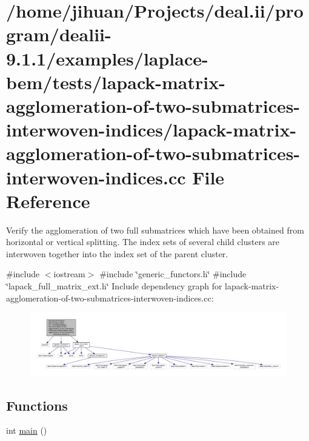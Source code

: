 \hypertarget{lapack-matrix-agglomeration-of-two-submatrices-interwoven-indices_8cc}{}\section{/home/jihuan/\+Projects/deal.ii/program/dealii-\/9.1.1/examples/laplace-\/bem/tests/lapack-\/matrix-\/agglomeration-\/of-\/two-\/submatrices-\/interwoven-\/indices/lapack-\/matrix-\/agglomeration-\/of-\/two-\/submatrices-\/interwoven-\/indices.cc File Reference}
\label{lapack-matrix-agglomeration-of-two-submatrices-interwoven-indices_8cc}


Verify the agglomeration of two full submatrices which have been obtained from horizontal or vertical splitting. The index sets of several child clusters are interwoven together into the index set of the parent cluster.  


{\ttfamily \#include $<$iostream$>$}\newline
{\ttfamily \#include \char`\"{}generic\+\_\+functors.\+h\char`\"{}}\newline
{\ttfamily \#include \char`\"{}lapack\+\_\+full\+\_\+matrix\+\_\+ext.\+h\char`\"{}}\newline
Include dependency graph for lapack-\/matrix-\/agglomeration-\/of-\/two-\/submatrices-\/interwoven-\/indices.cc\+:\nopagebreak
\begin{figure}[H]
\begin{center}
\leavevmode
\includegraphics[width=350pt]{lapack-matrix-agglomeration-of-two-submatrices-interwoven-indices_8cc__incl}
\end{center}
\end{figure}
\subsection*{Functions}
\begin{DoxyCompactItemize}
\item 
int \hyperlink{lapack-matrix-agglomeration-of-two-submatrices-interwoven-indices_8cc_ae66f6b31b5ad750f1fe042a706a4e3d4}{main} ()
\end{DoxyCompactItemize}


